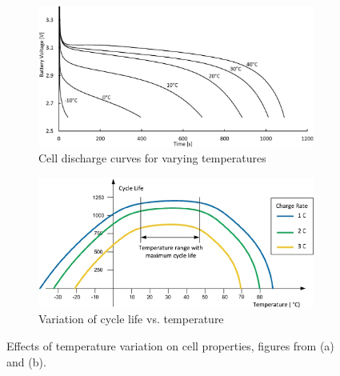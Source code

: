 \begin{figure}[H]
    \centering
    \begin{subfigure}[b]{0.47\textwidth} %
        \centering
        \includegraphics[width=\textwidth]{figs/Samuel/Figures/chenbattery.png}
        \caption{Cell discharge curves for varying temperatures \cite{chen2013heat}}
        \label{fig:tempy1}
    \end{subfigure}
    \hspace{0.04\textwidth}
    \begin{subfigure}[b]{0.47
    \textwidth} %
        \centering
        \includegraphics[width=\textwidth]{figs/Samuel/Figures/Lithium-ion-battery-life-vs-temperature-and-charging-rate-36-39-44-45.png}
        \caption{Variation of cycle life vs. temperature \cite{REZVANIZANIANI2014110}}
        \label{fig:tempy2}
    \end{subfigure}
    \caption{Effects of temperature variation on cell properties, figures from \cite{chen2013heat} (a) and \cite{REZVANIZANIANI2014110} (b).}
    \label{fig:tempythings}
\end{figure}

